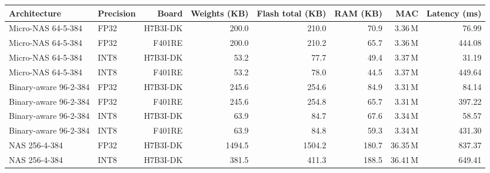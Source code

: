 \begin{tabular}{llrrrrrr}
\toprule
Architecture & Precision & Board & Weights (KB) & Flash total (KB) & RAM (KB) & MAC & Latency (ms)\\
\midrule
Micro-NAS 64-5-384 & FP32 & H7B3I-DK & 200.0 & 210.0 & 70.9 & 3.36\,M & 76.99\\
Micro-NAS 64-5-384 & FP32 & F401RE & 200.0 & 210.2 & 65.7 & 3.36\,M & 444.08\\
Micro-NAS 64-5-384 & INT8 & H7B3I-DK & 53.2 & 77.7 & 49.4 & 3.37\,M & 31.19\\
Micro-NAS 64-5-384 & INT8 & F401RE & 53.2 & 78.0 & 44.5 & 3.37\,M & 449.64\\
\midrule
Binary-aware 96-2-384 & FP32 & H7B3I-DK & 245.6 & 254.6 & 84.9 & 3.31\,M & 84.14\\
Binary-aware 96-2-384 & FP32 & F401RE & 245.6 & 254.8 & 65.7 & 3.31\,M & 397.22\\
Binary-aware 96-2-384 & INT8 & H7B3I-DK & 63.9 & 84.7 & 67.6 & 3.34\,M & 58.57\\
Binary-aware 96-2-384 & INT8 & F401RE & 63.9 & 84.8 & 59.3 & 3.34\,M & 431.30\\
\midrule
NAS 256-4-384 & FP32 & H7B3I-DK & 1494.5 & 1504.2 & 180.7 & 36.35\,M & 837.37\\
NAS 256-4-384 & INT8 & H7B3I-DK & 381.5 & 411.3 & 188.5 & 36.41\,M & 649.41\\
\bottomrule
\end{tabular}
